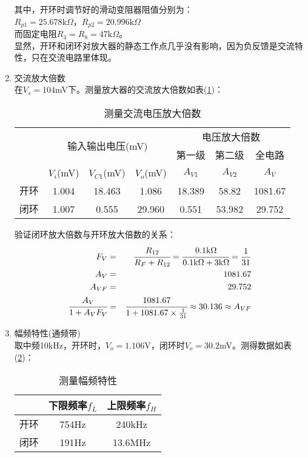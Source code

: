\documentclass[a4paper]{article}
\begin{document}
\begin{enumerate}
其中，开环时调节好的滑动变阻器阻值分别为：\\
$R_{p1} = 25.678\text{k}\Omega$，$R_{p2} = 20.996\text{k}\Omega$\\
而固定电阻$R_3 = R_8 = 47\text{k}\Omega$。\\
显然，开环和闭环对放大器的静态工作点几乎没有影响，因为负反馈是交流特性，只在交流电路里体现。
\item 交流放大倍数\\
在$V_s = 104$mV下。测量放大器的交流放大倍数如表(\ref{AvAC})：
\begin{table}[H]
\centering
\caption{测量交流电压放大倍数}
\label{AvAC}
\begin{tabular}{|c|c|c|c|c|c|c|}
\hline
   & \multicolumn{3}{c|}{\multirow{2}{*}{输入输出电压(mV)}} & \multicolumn{3}{c|}{电压放大倍数} \\ \cline{1-1} \cline{5-7} 
   & \multicolumn{3}{c|}{}                            & 第一级      & 第二级      & 全电路   \\ \hline
   & $V_i$(mV)     & $V_{C1}$(mV)     & $V_o$(mV)     & $A_{V1}$ & $A_{V2}$ & $A_V$ \\ \hline
开环 & 1.004 & 18.463 & 1.086 & 18.389 & 58.82 & 1081.67 \\ \hline
闭环 & 1.007 & 0.555 & 29.960 & 0.551 & 53.982 & 29.752 \\ \hline
\end{tabular}
\end{table}
验证闭环放大倍数与开环放大倍数的关系：
\begin{eqnarray}
F_V &=& \cfrac{R_{12}}{R_F+R_{12}} = \cfrac{0.1\text{k}\Omega}{0.1\text{k}\Omega+3\text{k}\Omega} = \frac{1}{31}\\
A_{V} &=& 1081.67\\
A_{VF} &=& 29.752\\
\cfrac{A_V}{1+A_VF_V} &=& \cfrac{1081.67}{1+1081.67\times\frac{1}{31}} \approx 30.136 \approx A_{VF}
\end{eqnarray}
\item 幅频特性(通频带)\\
取中频10kHz，开环时，$V_{o} = 1.106$V，闭环时$V_o = 30.2$mV。测得数据如表(\ref{fHL})：
\begin{table}[!h]
\centering
\caption{测量幅频特性}
\label{fHL}
\begin{tabular}{|c|c|c|}
\hline
   & 下限频率$f_L$ & 上限频率$f_H$ \\ \hline
开环 & 754Hz & 240kHz \\ \hline
闭环 & 191Hz & 13.6MHz \\ \hline
\end{tabular}
\end{table}


\end{enumerate}
\end{document}
